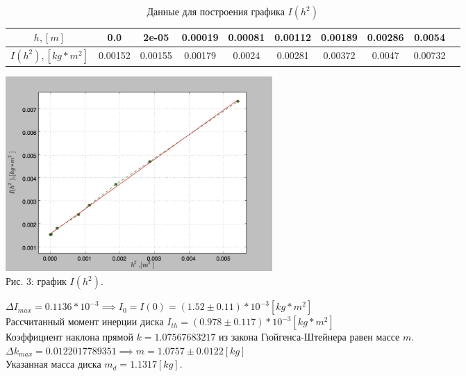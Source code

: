 \documentclass[12pt]{article}
\begin{document}
\begin{enumerate}
\begin{enumerate}
                    \begin{table}[h]
                        \caption{Данные для построения графика $I(h^2)$}
                        \begin{center}
                        \begin{tabular}{|c|c|c|c|c|c|c|c|c|c|}
                            \hline 
                                $h , [m]$ & 0.0 & 2e-05 & 0.00019 & 0.00081 & 0.00112 & 0.00189 & 0.00286 & 0.0054 \\
                            \hline
                                $I(h^2) , [kg * m^2]$ & 0.00152 & 0.00155 & 0.00179 & 0.0024 & 0.00281 & 0.00372 & 0.0047 & 0.00732 \\
                            \hline
                            \end{tabular}
                        \end{center}
                    \end{table}
            \end{enumerate}
            \begin{center} 
                \includegraphics[width=4in]{plot.png} \\ Рис. 3: график $I(h^2)$.
            \end{center}
                $\Delta I_{max} = 0.1136 * 10^{-3} \implies I_0 = I(0) = (1.52 \pm 0.11) * 10 ^ {-3} [kg * m^2]$ \\
                Рассчитанный момент инерции диска $ I_{th} = (0.978 \pm 0.117) * 10^{-3} [kg * m^2] $ \\ 

                Коэффициент наклона прямой $k = 1.07567683217$ из закона Гюйгенса-Штейнера равен массе $m$. \\  
                $\Delta k_{max} = 0.0122017789351 \implies m = 1.0757  \pm 0.0122 [kg]$ \\
                Указанная масса диска $m_{d} = 1.1317 [kg]$.


    \end{enumerate}     
\end{document}
